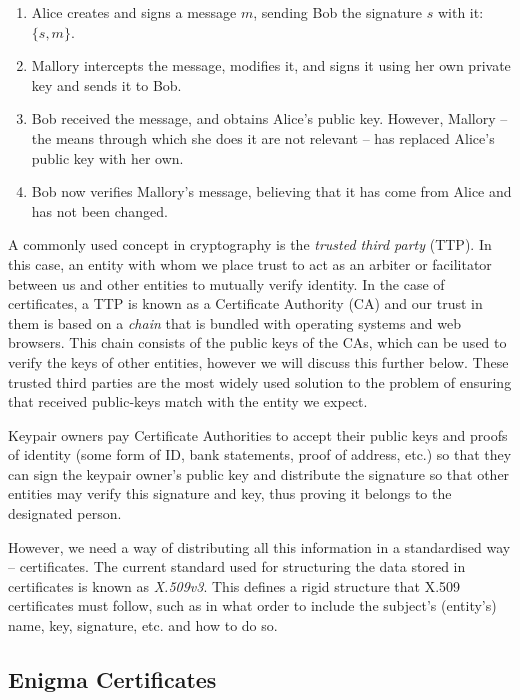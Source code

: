   \begin{enumerate}
    \item Alice creates and signs a message $m$, sending Bob the signature $s$ with it: $\{s,m\}$.
    \item Mallory intercepts the message, modifies it, and signs it using her own private key and sends it to Bob.
    \item Bob received the message, and obtains Alice's public key. However, Mallory -- the means through which she does it are not relevant -- has replaced Alice's public key with her own.
    \item Bob now verifies Mallory's message, believing that it has come from Alice and has not been changed.
  \end{enumerate}
  
  A commonly used concept in cryptography is the \emph{trusted third party} (TTP). In this case, an entity with whom we place trust to act as an arbiter or facilitator between us and other entities to mutually verify identity. In the case of certificates, a TTP is known as a Certificate Authority (CA) and our trust in them is based on a \emph{chain} that is bundled with operating systems and web browsers. This chain consists of the public keys of the CAs, which can be used to verify the keys of other entities, however we will discuss this further below. These trusted third parties are the most widely used solution to the problem of ensuring that received public-keys match with the entity we expect.
  
  Keypair owners pay Certificate Authorities to accept their public keys and proofs of identity (some form of ID, bank statements, proof of address, etc.) so that they can sign the keypair owner's public key and distribute the signature so that other entities may verify this signature and key, thus proving it belongs to the designated person.
  
  However, we need a way of distributing all this information in a standardised way -- certificates. The current standard used for structuring the data stored in certificates is known as \emph{X.509v3}\cite{Cooper:2008aa}. This defines a rigid structure that X.509 certificates must follow, such as in what order to include the subject's (entity's) name, key, signature, etc. and how to do so.
  
  \subsection{Enigma Certificates}
  
